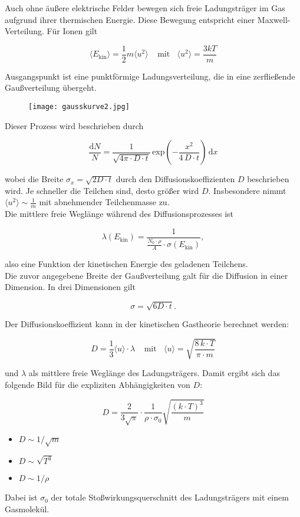 Auch ohne äußere elektrische Felder bewegen sich freie Ladungsträger im Gas aufgrund ihrer
thermischen Energie. Diese Bewegung entspricht einer Maxwell-Verteilung. Für Ionen gilt

\[\langle E_{\text{kin}} \rangle = \frac{1}{2} m \langle u^2 \rangle ~~~~~\text{mit}~~~~ \langle u^2
\rangle = \frac{3kT}{m}
\]

Ausgangspunkt ist eine punktförmige Ladungsverteilung, die in eine zerfließende Gaußverteilung
übergeht.

\begin{figure}[H]
	\centering
	\texttt{[image: gausskurve2.jpg]}
\end{figure}

Dieser Prozess wird beschrieben durch

\[\frac{\mathrm{d}N}{N} = \frac{1}{\sqrt{4\pi\cdot D\cdot t}}\,
\text{exp}\left(-\frac{x^2}{4\,D\cdot t}\right)\,\mathrm{d}x
\]

wobei die Breite $\sigma_x=\sqrt{2D\cdot t}$ durch den Diffusionskoeffizienten $D$ beschrieben wird.
Je schneller die Teilchen sind, desto größer wird $D$. Insbesondere nimmt $\langle u^2 \rangle \sim
\frac{1}{m}$ mit abnehmender Teilchenmasse zu.
\\
Die mittlere freie Weglänge während des Diffusionsprozesses ist 

\[\lambda(E_{\text{kin}}) = \frac{1}{\frac{N_0\cdot\rho}{A}\cdot \sigma(E_{\text{kin}})} ,\]

also eine Funktion der kinetischen Energie des geladenen Teilchens.
\\
Die zuvor angegebene Breite der Gaußverteilung galt für die Diffusion in einer Dimension. In drei
Dimensionen gilt

\[\sigma = \sqrt{6D\cdot t} . \]

Der Diffusionskoeffizient kann in der kinetischen Gastheorie berechnet werden:

\[D=\frac{1}{3} \langle u \rangle \cdot \lambda~~~~~\text{mit}~~~~\langle u \rangle
=\sqrt{\frac{8\,k\cdot T}{\pi\cdot m}}\]

und $\lambda$ als mittlere freie Weglänge des Ladungsträgers. Damit ergibt sich das folgende Bild
für die expliziten Abhängigkeiten von $D$:

\[ D= \frac{2}{3\sqrt{\pi}}\cdot \frac{1}{\rho\cdot\sigma_0}\sqrt{\frac{(k\cdot T)^3}{m}} \]

\begin{itemize}
  \item $D\sim 1/\sqrt{m}$
  \item $D\sim \sqrt{T^3}$
  \item $D\sim 1/\rho$
\end{itemize}

Dabei ist $\sigma_0$ der totale Stoßwirkungsquerschnitt des Ladungsträgers mit einem Gasmolekül.

